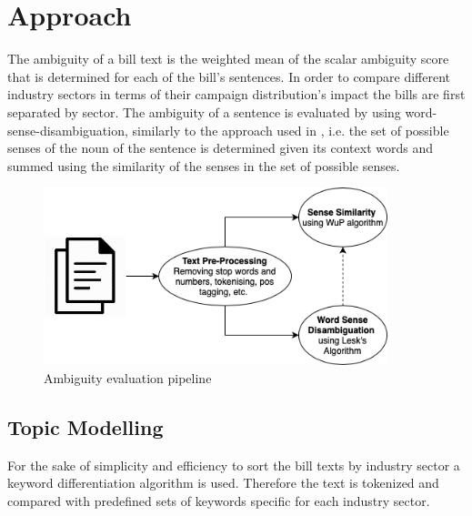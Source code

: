 \documentclass{custom_report}
\begin{document}
\chapter{Approach}
\label{cha:approach}
The ambiguity of a bill text is the weighted mean of the scalar ambiguity score that is determined for each of the bill's sentences. In order to compare different industry sectors in terms of their campaign distribution's impact the bills are first separated by sector. The ambiguity of a sentence is evaluated by using word-sense-disambiguation, similarly to the approach used in \cite{word_to_sense_embedding}, i.e. the set of possible senses of the noun of the sentence is determined given its context words and summed using the similarity of the senses in the set of possible senses.

\begin{figure}[h!]
\begin{center}
\includegraphics[width=10cm]{images/ambiguity.png}
\end{center}
\caption{Ambiguity evaluation pipeline}
\end{figure}

\section{Topic Modelling}
For the sake of simplicity and efficiency to sort the bill texts by industry sector a keyword differentiation algorithm is used. Therefore the text is tokenized and compared with predefined sets of keywords specific for each industry sector.
\end{document}
